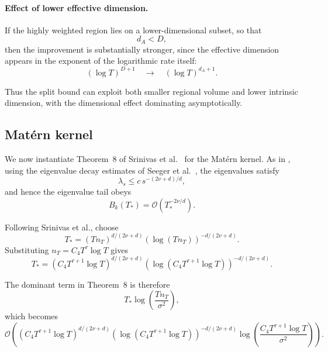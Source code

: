 \paragraph{Effect of lower effective dimension.}
If the highly weighted region lies on a lower-dimensional subset, so that
\begin{equation*}
d_A<D,
\end{equation*}
then the improvement is substantially stronger, since the effective dimension appears in the exponent of the logarithmic rate itself:
\begin{equation*}
(\log T)^{D+1}
\quad\longrightarrow\quad
(\log T)^{d_A+1}.
\end{equation*}

Thus the split bound can exploit both smaller regional volume and lower intrinsic dimension, with the dimensional effect dominating asymptotically.

\subsection{Mat\'ern kernel}

We now instantiate Theorem~8 of Srinivas et al.~\cite{Srinivas2009} for the Mat\'ern kernel. As in \cite{Srinivas2009}, using the eigenvalue decay estimates of Seeger et al.~\cite{Seeger2008}, the eigenvalues satisfy
\begin{equation*}
\lambda_s
\leq
c\,s^{-(2\nu+d)/d},
\end{equation*}
and hence the eigenvalue tail obeys
\begin{equation*}
B_k(T_*)
=
\mathcal{O}
\left(
T_*^{-2\nu/d}
\right).
\end{equation*}

Following Srinivas et al., choose
\begin{equation*}
T_*
=
(Tn_T)^{d/(2\nu+d)}
\left(
\log(Tn_T)
\right)^{-d/(2\nu+d)}.
\end{equation*}
Substituting $n_T=C_4T^\tau\log T$ gives
\begin{equation*}
T_*
=
\left(
C_4T^{\tau+1}\log T
\right)^{d/(2\nu+d)}
\left(
\log(C_4T^{\tau+1}\log T)
\right)^{-d/(2\nu+d)}.
\end{equation*}

The dominant term in Theorem~8 is therefore
\begin{equation*}
T_*
\log\left(
\frac{Tn_T}{\sigma^2}
\right),
\end{equation*}
which becomes
\begin{equation}  \label{eq: dominantterm}
\mathcal{O}
\left(
\left(
C_4T^{\tau+1}\log T
\right)^{d/(2\nu+d)}
\left(
\log(C_4T^{\tau+1}\log T)
\right)^{-d/(2\nu+d)}
\log\left(
\frac{C_4T^{\tau+1}\log T}{\sigma^2}
\right)
\right).
\end{equation}

